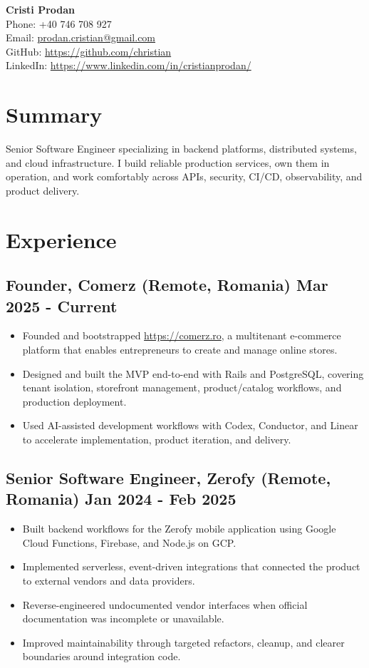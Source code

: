 \documentclass[11pt,a4paper]{article}
\begin{document}
{\LARGE \textbf{Cristi Prodan}}\\
Phone: +40 746 708 927 \\
Email: \href{mailto:prodan.cristian@gmail.com}{prodan.cristian@gmail.com} \\
GitHub: \href{https://github.com/christian}{https://github.com/christian} \\
LinkedIn: \href{https://www.linkedin.com/in/cristianprodan/}{https://www.linkedin.com/in/cristianprodan/} \\

\section*{Summary}
Senior Software Engineer specializing in backend platforms, distributed systems, and cloud infrastructure. I build reliable production services, own them in operation, and work comfortably across APIs, security, CI/CD, observability, and product delivery.

\section*{Experience}
\subsection*{Founder, Comerz (Remote, Romania) \hfill Mar 2025 - Current}
\begin{itemize}
  \item Founded and bootstrapped \href{https://comerz.ro}{https://comerz.ro}, a multitenant e-commerce platform that enables entrepreneurs to create and manage online stores.
  \item Designed and built the MVP end-to-end with Rails and PostgreSQL, covering tenant isolation, storefront management, product/catalog workflows, and production deployment.
  \item Used AI-assisted development workflows with Codex, Conductor, and Linear to accelerate implementation, product iteration, and delivery.
\end{itemize}

\subsection*{Senior Software Engineer, Zerofy (Remote, Romania) \hfill Jan 2024 - Feb 2025}
\begin{itemize}
  \item Built backend workflows for the Zerofy mobile application using Google Cloud Functions, Firebase, and Node.js on GCP.
  \item Implemented serverless, event-driven integrations that connected the product to external vendors and data providers.
  \item Reverse-engineered undocumented vendor interfaces when official documentation was incomplete or unavailable.
  \item Improved maintainability through targeted refactors, cleanup, and clearer boundaries around integration code.
\end{itemize}
\end{document}
